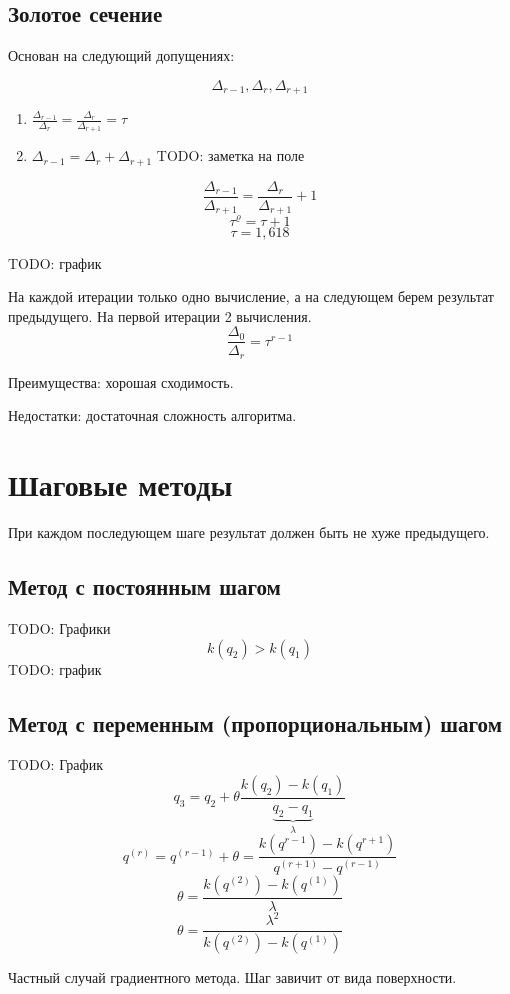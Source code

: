 \documentclass[12pt,a5paper]{scrbook}
\begin{document}
  \subsection{Золотое сечение}
  Основан на следующий допущениях:
  \par
  $$\Delta_{r-1}, \Delta_r, \Delta_{r+1}$$
  \par
  \begin{enumerate}
    \item $\frac{\Delta_{r-1}}{\Delta_r} = \frac{\Delta_r}{\Delta_{r+1}} = \tau$
    \item $\Delta_{r-1} = \Delta_r + \Delta_{r+1}$
    TODO: заметка на поле
  \end{enumerate}
  $$\frac{\Delta_{r-1}}{\Delta_{r+1}} = \frac{\Delta_r}{\Delta_{r+1}} + 1$$
  $$\tau^\varrho = \tau + 1$$
  $$\tau = 1,618$$
  \par
  TODO: график
  \par
  На каждой итерации только одно вычисление, а на следующем берем результат предыдущего. На первой итерации 2 вычисления.
  $$\frac{\Delta_0}{\Delta_r} = \tau^{r-1}$$
  \par
  Преимущества: хорошая сходимость.
  \par
  Недостатки: достаточная сложность алгоритма.
  \section{Шаговые методы}
  При каждом последующем шаге результат должен быть не хуже предыдущего.
  \par
  \subsection{Метод с постоянным шагом}
  TODO: Графики
  $$k(q_2)>k(q_1)$$ TODO: график
  \subsection{Метод с переменным (пропорциональным) шагом}
  TODO: График
  $$q_3 = q_2 + \theta\frac{k(q_2) - k(q_1)}{\underbrace{q_2 - q_1}_{\lambda}}$$
  $$q^{(r)} = q^{(r-1)} + \theta = \frac{k(q^{r-1}) - k(q^{r+1})}{q^{(r+1)} - q^{(r-1)}}$$
  $$\theta = \frac{k(q^{(2)}) - k(q^{(1)})}{\lambda}$$
  $$\theta = \frac{\lambda^2}{k(q^{(2)}) - k(q^{(1)})}$$
  \par
  Частный случай градиентного метода. Шаг завичит от вида поверхности.
\end{document}
